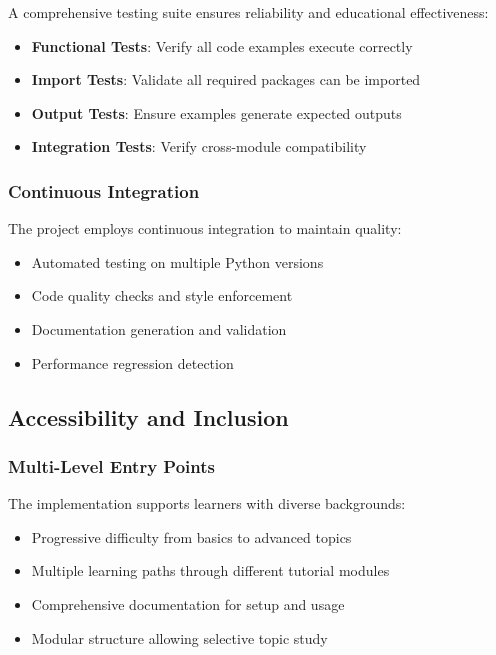 A comprehensive testing suite ensures reliability and educational effectiveness:

\begin{itemize}
    \item \textbf{Functional Tests}: Verify all code examples execute correctly
    \item \textbf{Import Tests}: Validate all required packages can be imported
    \item \textbf{Output Tests}: Ensure examples generate expected outputs
    \item \textbf{Integration Tests}: Verify cross-module compatibility
\end{itemize}

\subsubsection{Continuous Integration}

The project employs continuous integration to maintain quality:

\begin{itemize}
    \item Automated testing on multiple Python versions
    \item Code quality checks and style enforcement
    \item Documentation generation and validation
    \item Performance regression detection
\end{itemize}

\subsection{Accessibility and Inclusion}

\subsubsection{Multi-Level Entry Points}

The implementation supports learners with diverse backgrounds:

\begin{itemize}
    \item Progressive difficulty from basics to advanced topics
    \item Multiple learning paths through different tutorial modules
    \item Comprehensive documentation for setup and usage
    \item Modular structure allowing selective topic study
\end{itemize}

